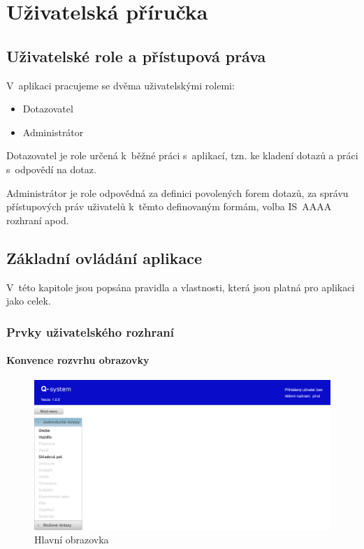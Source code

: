 \documentclass[thesis=M,czech]{FITthesis}[2019/12/23]
\begin{document}
\chapter{Uživatelská příručka}
\label{UzivatelskaPrirucka}
\section{Uživatelské role a přístupová práva}
V~aplikaci pracujeme se dvěma uživatelskými rolemi:
\begin{itemize}
	\item Dotazovatel
	\item Administrátor
\end{itemize}

Dotazovatel je role určená k~běžné práci s~aplikací, tzn. ke kladení dotazů a práci s~odpovědí na dotaz.

Administrátor je role odpovědná za definici povolených forem dotazů, za správu přístupových práv uživatelů k~těmto definovaným formám, volba IS~AAAA rozhraní apod.

\newpage
\section{Základní ovládání aplikace}
V~této kapitole jsou popsána pravidla a vlastnosti, která jsou platná pro aplikaci jako celek.

\subsection{Prvky uživatelského rozhraní}
\subsubsection{Konvence rozvrhu obrazovky}
\begin{figure}[H]
  \centering
  \includegraphics[width=\textwidth]{res/guide/Dashboard.png}
  \caption{Hlavní obrazovka}
  \label{fig:Hlavní obrazovka}
\end{figure}
\end{document}
